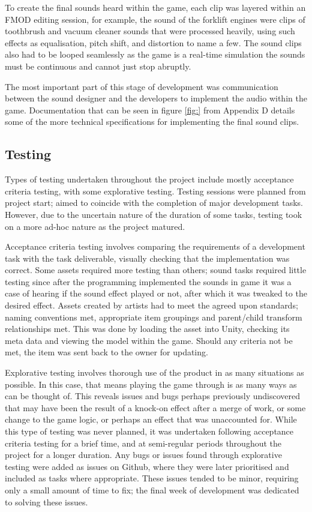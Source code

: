 \documentclass[12pt]{article}
\begin{document}
To create the final sounds heard within the game, each clip was layered within an FMOD editing session, for example, the sound of the forklift engines were clips of toothbrush and vacuum cleaner sounds that were processed heavily, using such effects as equalisation, pitch shift, and distortion to name a few. The sound clips also had to be looped seamlessly as the game is a real-time simulation the sounds must be continuous and cannot just stop abruptly.

The most important part of this stage of development was communication between the sound designer and the developers to implement the audio within the game. Documentation that can be seen in figure \ref{fig:} from Appendix D details some of the more technical specifications for implementing the final sound clips.

\subsection{Testing}
Types of testing undertaken throughout the project include mostly acceptance criteria testing, with some explorative testing. Testing sessions were planned from project start; aimed to coincide with the completion of major development tasks. However, due to the uncertain nature of the duration of some tasks, testing took on a more ad-hoc nature as the project matured. 

Acceptance criteria testing involves comparing the requirements of a development task with the task deliverable, visually checking that the implementation was correct. Some assets required more testing than others; sound tasks required little testing since after the programming implemented the sounds in game it was a case of hearing if the sound effect played or not, after which it was tweaked to the desired effect. Assets created by artists had to meet the agreed upon standards; naming conventions met, appropriate item groupings and parent/child transform relationships met. This was done by loading the asset into Unity, checking its meta data and viewing the model within the game. Should any criteria not be met, the item was sent back to the owner for updating. 

Explorative testing involves thorough use of the product in as many situations as possible. In this case, that means playing the game through is as many ways as can be thought of. This reveals issues and bugs perhaps previously undiscovered that may have been the result of a knock-on effect after a merge of work, or some change to the game logic, or perhaps an effect that was unaccounted for. While this type of testing was never planned, it was undertaken following acceptance criteria testing for a brief time, and at semi-regular periods throughout the project for a longer duration. Any bugs or issues found through explorative testing were added as issues on Github, where they were later prioritised and included as tasks where appropriate. These issues tended to be minor, requiring only a small amount of time to fix; the final week of development was dedicated to solving these issues. 
\end{document}
